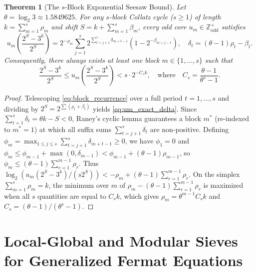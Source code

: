 \documentclass[11pt, a4paper]{amsart}
\newtheorem{theorem}{Theorem}[section]
\theoremstyle{definition}
\newcommand{\Z}{\mathbb{Z}}
\begin{document}
\begin{theorem}[The $s$-Block Exponential Seesaw Bound]\label{thm:s_block_seesaw}
Let $\theta = \log_2 3 \approx 1.5849625$. For any $s$-block Collatz cycle ($s \ge 1$) of length $k = \sum_{m=1}^s \rho_m$ and shift $S = k + \sum_{m=1}^s \beta_m$, every odd core $u_m \in \Z_{\text{odd}}^+$ satisfies
\begin{equation}\label{eq:um_exact_delta}
u_m \left(\frac{2^S - 3^k}{2^S}\right) = 2^{-\rho_m} \sum_{j=1}^s 2^{\sum_{t=j+1}^s \delta_{m+t-1}} \left(1 - 2^{-\beta_{m+j-1}}\right), \quad \delta_t = (\theta - 1)\rho_t - \beta_t.
\end{equation}
Consequently, there always exists at least one block $m \in \{1, \dots, s\}$ such that
\begin{equation}\label{eq:s_seesaw}
\frac{2^S - 3^k}{2^S} \le u_m \left(\frac{2^S - 3^k}{2^S}\right) < s \cdot 2^{-C_s k}, \quad \text{where} \quad C_s = \frac{\theta - 1}{\theta^s - 1}.
\end{equation}
\end{theorem}

\begin{proof}
Telescoping \eqref{eq:block_recurrence} over a full period $t = 1, \dots, s$ and dividing by $2^S = 2^{\sum(\rho_t + \beta_t)}$ yields \eqref{eq:um_exact_delta}. Since $\sum_{t=1}^s \delta_t = \theta k - S < 0$, Raney's cyclic lemma guarantees a block $m^*$ (re-indexed to $m^* = 1$) at which all suffix sums $\sum_{t=j+1}^s \delta_{t}$ are non-positive. Defining $\phi_m = \max_{1 \le j \le s} \sum_{t=j+1}^s \delta_{m+t-1} \ge 0$, we have $\phi_1 = 0$ and $\phi_m \le \phi_{m-1} + \max(0, \delta_{m-1}) < \phi_{m-1} + (\theta - 1)\rho_{m-1}$, so $\phi_m \le (\theta - 1)\sum_{r=1}^{m-1} \rho_r$. Thus $\log_2(u_m(2^S - 3^k)/(s 2^S)) < -\rho_m + (\theta - 1)\sum_{r=1}^{m-1} \rho_r$. On the simplex $\sum_{m=1}^s \rho_m = k$, the minimum over $m$ of $\rho_m - (\theta - 1)\sum_{r=1}^{m-1} \rho_r$ is maximized when all $s$ quantities are equal to $C_s k$, which gives $\rho_m = \theta^{m-1} C_s k$ and $C_s = (\theta - 1)/(\theta^s - 1)$.
\end{proof}

\section{Local-Global and Modular Sieves for Generalized Fermat Equations}
\end{document}
